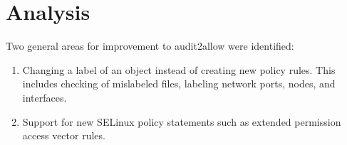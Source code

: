 
\chapter{Analysis}
\label{analysis}
Two general areas for improvement to audit2allow were identified:
\begin{enumerate}
    \item Changing a label of an object instead of creating new policy rules.
        This includes checking of mislabeled files, labeling network ports,
        nodes, and interfaces.
    \item Support for new SELinux policy statements such as extended permission
        access vector rules.
\end{enumerate}

